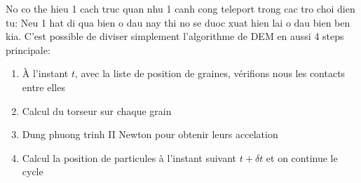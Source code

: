 \documentclass[a4paper,12pt]{report}
\begin{document}
No co the hieu 1 cach truc quan nhu 1 canh cong teleport trong cac tro choi dien tu: Neu 1 hat di qua bien o dau nay thi no se duoc xuat hien lai o dau bien ben kia.
C'est possible de diviser simplement l'algorithme de DEM en aussi 4 steps principale:
\begin{enumerate}
\item À l'instant $t$, avec la liste de position de graines, vérifions nous les contacts entre elles
\item Calcul du torseur sur chaque grain 
\item  Dung phuong trinh II Newton pour obtenir leurs accelation
\item Calcul la position de particules à l'instant suivant $t + \delta t$ et on continue le cycle
\end{enumerate}
\end{document}
